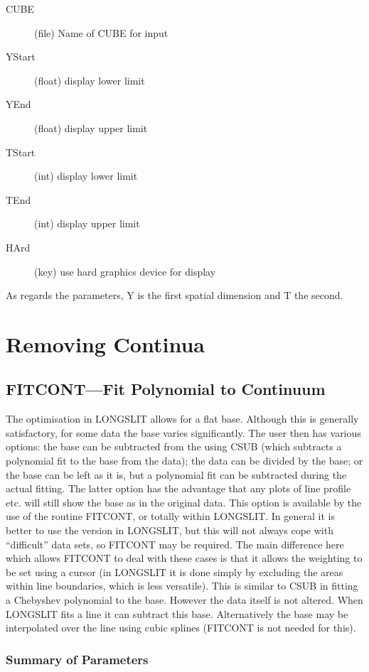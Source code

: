 \begin{description}
\item[CUBE] (file) Name of CUBE for input
\item[YStart] (float) display lower limit
\item[YEnd] (float) display upper limit
\item[TStart] (int) display lower limit
\item[TEnd] (int) display upper limit
\item[HArd] (key) use hard graphics device for display
\end{description}
As regards the parameters, Y is the first spatial dimension and T the
second.

\section{Removing Continua}
\subsection{FITCONT---Fit Polynomial to Continuum}

The optimisation in LONGSLIT allows for a flat base.
Although this is generally satisfactory, for some data the base varies
significantly.
The user then has various options: the base can be subtracted from the
using CSUB (which subtracts a polynomial fit to the base from the
data); the data can be divided by the base; or the base can be left as
it is, but a polynomial fit can be subtracted during the actual fitting.
The latter option has the advantage that any plots of line profile etc.
will still show the base as in the original data.
This option is available by the use of the routine FITCONT, or totally
within LONGSLIT.
In general it is better to use the version in LONGSLIT, but this will
not always cope with ``difficult'' data sets, so FITCONT may be
required.
The main difference here which allows FITCONT to deal with these cases
is that it allows the weighting to be set using a cursor (in LONGSLIT it
is done simply by excluding the areas within line boundaries, which is
less versatile).
This is similar to CSUB in fitting a Chebyshev polynomial to the base.
However the data itself is not altered.
When LONGSLIT fits a line it can subtract this base.
Alternatively the base may be interpolated over the line using cubic
splines (FITCONT is not needed for this).

\subsubsection{Summary of Parameters}

